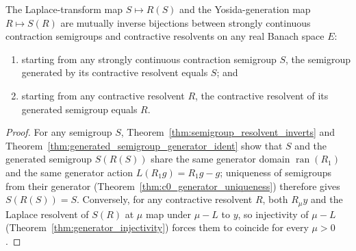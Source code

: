 \begin{theorem}\label{thm:hille_yosida_bijection}
\leanok
The Laplace-transform map $S \mapsto R(S)$ and the Yosida-generation map $R \mapsto S(R)$ are mutually inverse bijections between strongly continuous contraction semigroups and contractive resolvents on any real Banach space $E$:
\begin{enumerate}
  \item starting from any strongly continuous contraction semigroup $S$, the semigroup generated by its contractive resolvent equals $S$; and
  \item starting from any contractive resolvent $R$, the contractive resolvent of its generated semigroup equals $R$.
\end{enumerate}
\end{theorem}

\begin{proof}
\leanok
For any semigroup $S$, Theorem~\ref{thm:semigroup_resolvent_inverts} and Theorem~\ref{thm:generated_semigroup_generator_ident} show that $S$ and the generated semigroup $S(R(S))$ share the same generator domain $\operatorname{ran}(R_1)$ and the same generator action $L(R_1 g) = R_1 g - g$; uniqueness of semigroups from their generator (Theorem~\ref{thm:c0_generator_uniqueness}) therefore gives $S(R(S)) = S$. Conversely, for any contractive resolvent $R$, both $R_\mu y$ and the Laplace resolvent of $S(R)$ at $\mu$ map under $\mu - L$ to $y$, so injectivity of $\mu - L$ (Theorem~\ref{thm:generator_injectivity}) forces them to coincide for every $\mu > 0$.
\end{proof}
